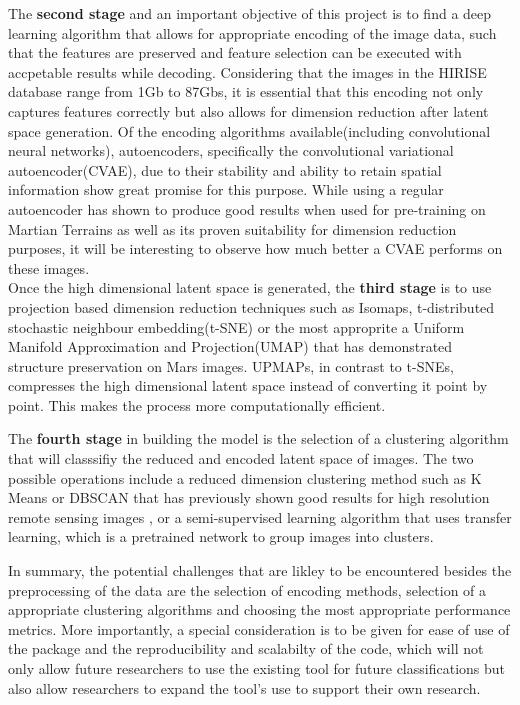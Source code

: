 \documentclass[project-plan]{report-template}
\begin{document}
The \textbf{second stage} and an important objective of this project is to find a deep learning algorithm that allows for appropriate encoding of the image data, such that the features are preserved and feature selection can be executed with accpetable results while decoding. Considering that the images in the HIRISE database range from 1Gb to 87Gbs, it is essential that this encoding not only captures features correctly but also allows for dimension reduction after latent space generation. Of the encoding algorithms available(including convolutional neural networks), autoencoders, specifically the convolutional variational autoencoder(CVAE), due to their stability and ability to retain spatial information show great promise for this purpose. While using a regular autoencoder has shown to produce good results when used for pre-training on Martian Terrains\citep{Rothrock2016SPOCDL} as well as its proven suitability for dimension reduction purposes\citep{WANG2016232}, it will be interesting to observe how much better a CVAE performs on these images. \\

Once the high dimensional latent space is generated, the \textbf{third stage} is to use projection based dimension reduction techniques such as Isomaps, t-distributed stochastic neighbour embedding(t-SNE) or the most approprite a Uniform Manifold Approximation and Projection(UMAP) that has demonstrated structure preservation on Mars images\citep{Allaoui2020ConsiderablyIC}. UPMAPs, in contrast to t-SNEs, compresses the high dimensional latent space  instead of converting it point by point. This makes the process more computationally efficient.

The \textbf{fourth stage} in building the model is the selection of a clustering algorithm that will classsifiy the reduced and encoded latent space of images. The two possible operations include a reduced dimension clustering method such as K Means or DBSCAN that has previously shown good results for high resolution remote sensing images \citep{ZHANG201675}, or a semi-supervised learning algorithm that uses transfer learning, which is a pretrained network to group images into clusters.

In summary, the potential challenges that are likley to be encountered  besides the preprocessing of the data are the selection of encoding methods, selection of a appropriate clustering algorithms and choosing the most appropriate performance metrics. More importantly, a special consideration is to be given for ease of use of the package and the reproducibility and scalabilty of the code, which will not only allow future researchers to use the existing tool for future classifications but also allow researchers to expand the tool's use to support their own research. 
\end{document}
